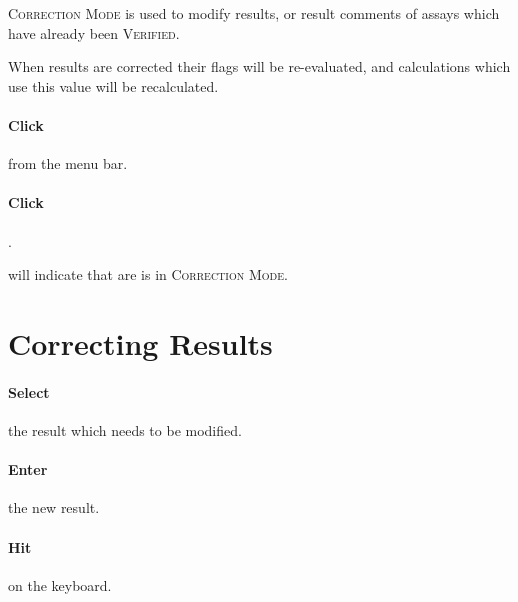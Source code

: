 \textsc{Correction Mode} is used to modify results, or result comments of assays which have already been \textsc{Verified}.

When results are corrected their flags will be re-evaluated, and calculations which use this value will be recalculated.

\paragraph{Click}  from the menu bar.

\paragraph{Click} .\\


  will indicate that \gls{are} is in \textsc{Correction Mode}.\\


\section{Correcting Results}

\paragraph{Select} the result which needs to be modified.\\


\paragraph{Enter} the new result.

\paragraph{Hit} {\faKeyboardO}  on the keyboard.\\

